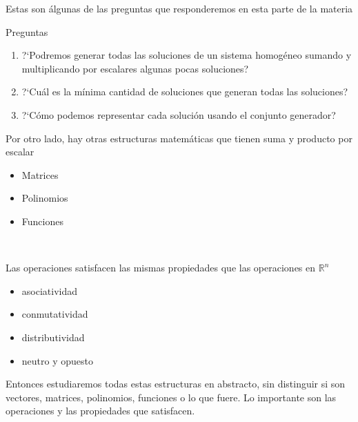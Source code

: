 \documentclass[handout]{beamer} %
\newcommand{\R}{\mathbb R}
\begin{document}
\begin{frame}

Estas son álgunas de las preguntas que responderemos en esta parte de la materia
\pause
\begin{block}{Preguntas}
\begin{enumerate}
    \item ?`Podremos generar todas las soluciones de un sistema homogéneo sumando y multiplicando por escalares algunas pocas soluciones?\pause
    \item ?`Cuál es la mínima cantidad de soluciones que generan todas las soluciones?\pause
    \item ?`Cómo podemos representar cada solución usando el conjunto generador?
\end{enumerate}
\end{block}

\end{frame}

\begin{frame}

Por otro lado, hay otras estructuras matemáticas que tienen suma y producto por escalar 
\begin{itemize}\pause
    \item Matrices\pause
    \item Polinomios\pause
    \item Funciones
\end{itemize}

\

Las operaciones satisfacen las mismas propiedades que las operaciones en $\R^n$
\begin{itemize}\pause
    \item asociatividad\pause
    \item conmutatividad\pause
    \item distributividad\pause
    \item neutro y opuesto
\end{itemize}


\end{frame}

\begin{frame}
Entonces estudiaremos todas estas estructuras en abstracto, sin distinguir si son vectores, matrices, polinomios, funciones o lo que fuere.
\vskip 1cm\pause
Lo importante son las operaciones y las propiedades que satisfacen.




\end{frame}  
\end{document}
